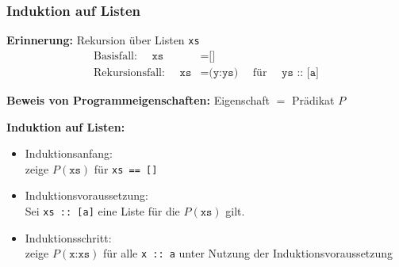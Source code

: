 \documentclass{beamer}
\begin{document}
\begin{frame} \frametitle{Induktion auf Listen}
	\footnotesize
	
	\textbf{Erinnerung:} Rekursion über Listen \texttt{xs}
	\begin{equation*}
		\begin{aligned}
			\text{Basisfall: } \quad \texttt{xs} &= \texttt{[]} \\
			\text{Rekursionsfall: }\quad \texttt{xs} &= \texttt{(y:ys)} \quad \text{ für } \quad \texttt{ys :: [a]}
		\end{aligned}
	\end{equation*}
	
	\textbf{Beweis von Programmeigenschaften:}
	Eigenschaft $=$ Prädikat $P$
	\begin{center}
	\end{center}
	
	\textbf{Induktion auf Listen:} \vspace{-0.5\baselineskip}
	\begin{itemize}
		\item \textcolor{cdblue}{Induktionsanfang}: \\
		zeige $P(\texttt{xs})$ für \texttt{xs == []}
		\item \textcolor{cdblue}{Induktionsvoraussetzung}:\\
		Sei \texttt{xs :: [a]} eine Liste für die $P(\texttt{xs})$ gilt.
		\item \textcolor{cdblue}{Induktionsschritt}: \\
		zeige $P(\texttt{x:xs})$ für alle \texttt{x :: a} unter Nutzung der Induktionsvoraussetzung
	\end{itemize}
	
\end{frame}
	
\end{document}
